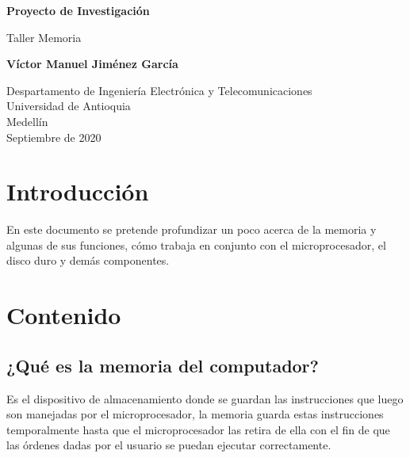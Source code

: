 \documentclass{article}
\begin{document}
\begin{titlepage}
    \begin{center}
        \vspace*{1cm}
            
        \Huge
        \textbf{Proyecto de Investigación}
            
        \vspace{0.5cm}
        \LARGE
        Taller Memoria
            
        \vspace{1.5cm}
            
        \textbf{Víctor Manuel Jiménez García}
            
        \vfill
            
        \vspace{0.8cm}
            
        \Large
        Despartamento de Ingeniería Electrónica y Telecomunicaciones\\
        Universidad de Antioquia\\
        Medellín\\
        Septiembre de 2020
            
    \end{center}
\end{titlepage}

\tableofcontents
\section{Introducción}
En este documento se pretende profundizar un poco acerca de la memoria y algunas de sus funciones, cómo trabaja en conjunto con el microprocesador, el disco duro y demás componentes.
\section{Contenido}
\subsection{¿Qué es la memoria del computador?}
Es el dispositivo de almacenamiento donde se guardan las instrucciones que luego son manejadas por el microprocesador, la memoria guarda estas instrucciones temporalmente hasta que el microprocesador las retira de ella con el fin de que las órdenes dadas por el usuario se puedan ejecutar correctamente.
\cite{memoria}
\end{document}
